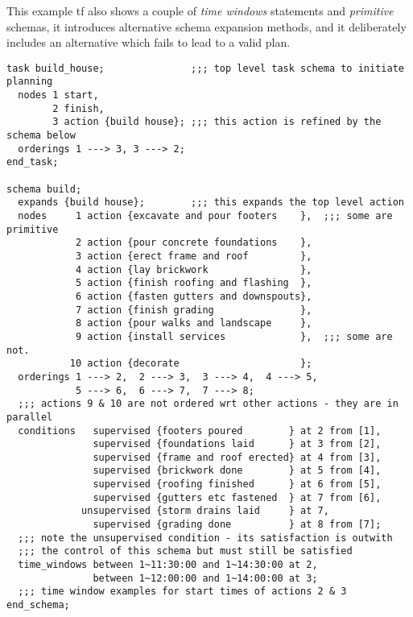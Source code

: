 This example {\sc tf} also shows a couple of {\em time windows} statements and
{\em primitive} schemas, it introduces alternative schema expansion methods,
and it deliberately includes an alternative which fails to lead to a valid
plan.

\begin{verbatim}
task build_house;               ;;; top level task schema to initiate planning
  nodes 1 start,  
        2 finish,
        3 action {build house}; ;;; this action is refined by the schema below
  orderings 1 ---> 3, 3 ---> 2;      
end_task;

schema build;
  expands {build house};        ;;; this expands the top level action
  nodes     1 action {excavate and pour footers    },  ;;; some are primitive
            2 action {pour concrete foundations    },
            3 action {erect frame and roof         },
            4 action {lay brickwork                },
            5 action {finish roofing and flashing  },
            6 action {fasten gutters and downspouts},
            7 action {finish grading               },
            8 action {pour walks and landscape     },
            9 action {install services             },  ;;; some are not.
           10 action {decorate                     };
  orderings 1 ---> 2,  2 ---> 3,  3 ---> 4,  4 ---> 5,
            5 ---> 6,  6 ---> 7,  7 ---> 8;
  ;;; actions 9 & 10 are not ordered wrt other actions - they are in parallel
  conditions   supervised {footers poured        } at 2 from [1],
               supervised {foundations laid      } at 3 from [2],
               supervised {frame and roof erected} at 4 from [3],
               supervised {brickwork done        } at 5 from [4],
               supervised {roofing finished      } at 6 from [5],
               supervised {gutters etc fastened  } at 7 from [6],
             unsupervised {storm drains laid     } at 7,
               supervised {grading done          } at 8 from [7];
  ;;; note the unsupervised condition - its satisfaction is outwith
  ;;; the control of this schema but must still be satisfied
  time_windows between 1~11:30:00 and 1~14:30:00 at 2,
               between 1~12:00:00 and 1~14:00:00 at 3;
  ;;; time window examples for start times of actions 2 & 3
end_schema;
  

\end{verbatim}
